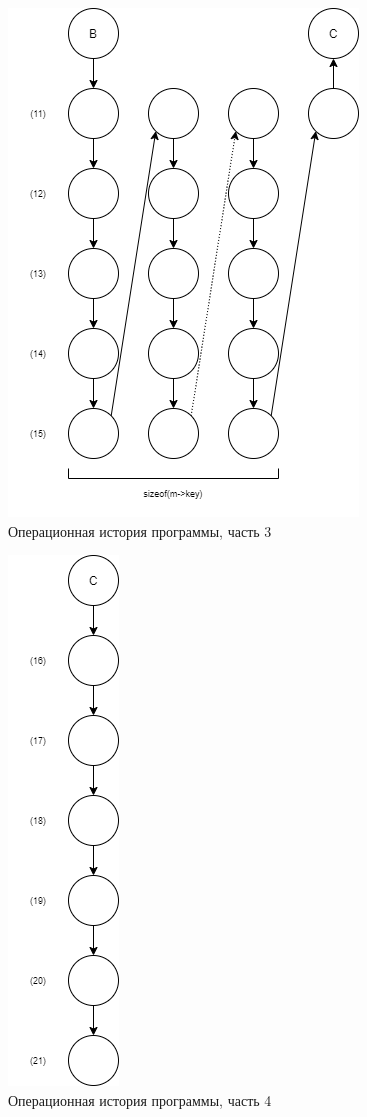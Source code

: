 \documentclass[12pt]{report}
\begin{document}
\begin{figure}[hp!]
	\centering
	\includegraphics[scale=0.7]{report_files/operation_history_3.png}
	\caption{Операционная история программы, часть 3}
	\label{fig:mpr}
\end{figure}

\begin{figure}[hp!]
	\centering
	\includegraphics[scale=0.7]{report_files/operation_history_4.png}
	\caption{Операционная история программы, часть 4}
	\label{fig:mpr}
\end{figure}
\newpage
\end{document}
